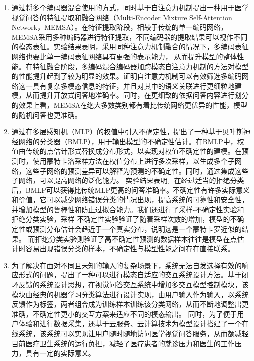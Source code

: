 \begin{enumerate}[topsep = 0 pt, itemsep= 0 pt, parsep=0pt, partopsep=0pt, leftmargin=44pt, itemindent=0pt, labelsep=6pt, label=(\arabic*)]
    \item 通过将多个编码器混合使用的方式，同时基于自注意力机制提出一种用于医学视觉问答的特征提取和融合网络（Multi-Encoder Mixture Self-Attention Network，MEMSA）。在特征提取阶段，相较于传统的单一编码网络，MEMSA采用多种编码器进行特征提取，不同编码器的提取结果可以视作不同的模态表征。实验结果表明，采用同种注意力机制融合的情况下，多编码表征网络也要比单一编码表征网络具有更强的表示能力，
    从而提升模型的整体性能。在特征融合阶段，多编码混合编码器加跨模态自注意力机制的方法对模型的性能提升起到了较为明显的效果。证明自注意力机制可以有效筛选多编码网络这一具有复杂多模态信息的特征，并且对其中的语义关联进行更细粒地建模，从而提升开放式问答地准确率。同时，在更细致的依据问答内容进行划分的效果上看，MEMSA在绝大多数类别都有着比传统网络更优异的性能，模型的随机问答也更准确。
    \item 通过在多层感知机（MLP）\cite{rosenblatt1958perceptron}的权值中引入不确定性，提出了一种基于贝叶斯神经网络的分类器（BMLP），用于输出模型的不确定性估计。在BMLP中，权值由传统的点估计形式替换成分布形式，以实现对权值不确定性的建模。在预测时，使用蒙特卡洛采样方法在权值分布上进行多次采样，以生成多个子网络，这些子网络的预测差异可以解释为预测的不确定性。同时，通过集成这些子网络，可以提高网络的泛化能力。
    实验结果表明，在经过适当的拒绝分类后，BMLP可以获得比传统MLP更高的问答准确率。不确定性有许多实际意义和价值，它可以减少网络错误分类的情况出现，提高系统的可靠性和安全性，并增加模型的鲁棒性和防止过拟合能力。我们还进行了采样-不确定性实验和拒绝分类实验，采样-不确定性实验验证了随着采样次数的增加，模型的不确定性或预测分布估计会趋近于一个真实分布，说明这是一个蒙特卡罗近似的结果。
    而拒绝分类实验则验证了高不确定性预测的数据样本往往是模型在点估计时容易出现错误分类的样本，不确定性与模型性能之间存在直接联系。
    \item 为了解决在面对不同且未知的输入的复杂场景下，系统无法自发选择有效的响应形式的问题，提出了一种可以进行模态自适应的交互系统设计方法。基于闭环反馈的系统设计思想，在视觉问答交互系统中增加多交互模型控制模块，该模块由经典的机器学习分类算法进行设计实现，由用户输入作为输入，以系统反馈作为标签，两者组合成为训练样本训练该分类网络，从而不断地调整出更准确，不确定性更小的交互方案来适应不同的模态输出。
    同时，为了便于用户体验和进行数据采集，还基于云服务、云计算技术为模型设计搭建了一个在线系统，该系统可以实现让用户随时随地访问医学视觉问答服务，从而额减轻目前医疗卫生系统的运行负担，减轻了医疗患者的就诊压力和医生的工作压力，具有一定的实际意义。
\end{enumerate}   

